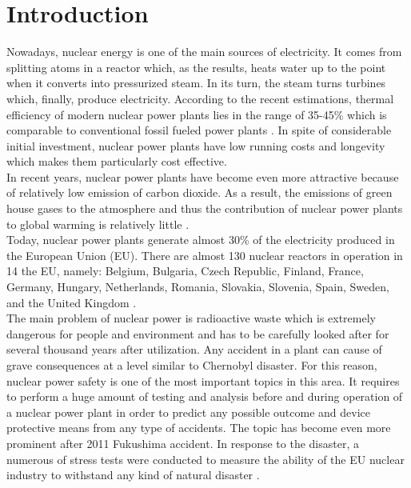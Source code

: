 \chapter{Introduction}\label{chapter:introduction}

Nowadays, nuclear energy is one of the main sources of electricity. It comes from splitting atoms in a reactor which, as the results, heats water up to the point when it converts into pressurized steam. In its turn, the steam turns turbines which, finally, produce electricity. According to the recent estimations, thermal efficiency of modern nuclear power plants lies in the range of 35-45\% which is comparable to conventional fossil fueled power plants \cite{intro:efficiency-of-nuclear-power-plants}. In spite of considerable initial investment,  nuclear power plants have low running costs and longevity which makes them particularly cost effective.\\


In recent years, nuclear power plants have become even more attractive because of relatively low emission of carbon dioxide. As a result, the emissions of green house gases to the atmosphere and thus the contribution of nuclear power plants to global warming is relatively little \cite{intro:pros-and-cons-of-nuclear-power}.\\


Today, nuclear power plants generate almost 30\% of the electricity produced in the European Union (EU). There are almost 130 nuclear reactors in operation in 14 the EU, namely: Belgium, Bulgaria, Czech Republic, Finland, France, Germany, Hungary, Netherlands, Romania, Slovakia, Slovenia, Spain, Sweden, and the United Kingdom \cite{intro:eu-nuclear-industry-general}.\\


The main problem of nuclear power is radioactive waste which is extremely dangerous for people and environment and has to be carefully looked after for several thousand years after utilization. Any accident in a plant can cause of grave consequences at a level similar to Chernobyl disaster. For this reason, nuclear power safety is one of the most important topics in this area. It requires to perform a huge amount of testing and analysis before and during operation of a nuclear power plant in order to predict any possible outcome and device protective means from any type of accidents. The topic has become even more prominent after 2011 Fukushima accident. In response to the disaster, a numerous of stress tests were conducted to measure the ability of the EU nuclear industry to withstand any kind of natural disaster \cite{intro:eu-nuclear-industry-general}.\\



